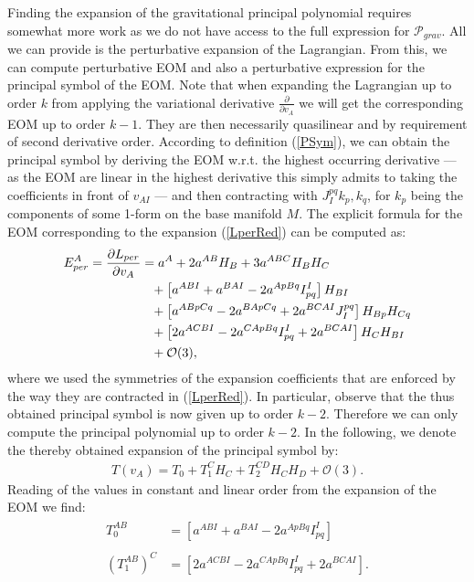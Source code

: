 Finding the expansion of the gravitational principal polynomial requires somewhat more work as we do not have access to the full expression for $\mathcal{P}_{grav}$. All we can provide is the perturbative expansion of the Lagrangian. From this, we can compute perturbative EOM and also a perturbative expression for the principal symbol of the EOM.
Note that when expanding the Lagrangian up to order $k$ from applying the variational derivative $\frac{\partial}{\partial v_A}$ we will get the corresponding EOM up to order $k-1$. They are then necessarily quasilinear and by requirement of second derivative order. According to definition (\ref{PSym}), we can obtain the principal symbol by deriving the EOM w.r.t. the highest occurring derivative  --- as the EOM are linear in the highest derivative this simply admits to taking the coefficients in front of $v_{AI}$ --- and then contracting with $J_I^{pq} k_p, k_q$, for $k_p$ being the components of some 1-form on the base manifold $M$. 
The explicit formula for the EOM corresponding to the expansion (\ref{LperRed}) can be computed as:
\begin{align}\label{EOMPert}
    \begin{aligned}
    E_{per}^A = \frac{\partial L_{per}}{\partial v_A} &= a^A + 2 a^{AB}H_B + 3a^{ABC}H_B H_C \\
    &\hphantom{=}+ \left [a^{ABI} + a^{BAI} - 2 a^{ApBq}I_{pq}^I  \right ] H_{BI} \\
    &\hphantom{=}+ \left[a^{ABpCq} -2a^{BApCq} +2a^{BCAI} J_I^{pq} \right]H_{Bp}H_{Cq} \\
    &\hphantom{=}+ \left [2a^{ACBI} -2a^{CApBq}I_{pq}^I + 2a^{BCAI} \right ]H_C H_{BI} \\
    &\hphantom{=}+ \mathcal{O}(3),
    \end{aligned}
\end{align}
where we used the symmetries of the expansion coefficients that are enforced by the way they are contracted in (\ref{LperRed}).
In particular, observe that the thus obtained principal symbol is now given up to order $k-2$. Therefore we can only compute the principal polynomial up to order $k-2$. In the following, we denote the thereby obtained expansion of the principal symbol by: 
\begin{align}
    T(v_A) = T_0 + T_1^CH_C + T_2^{CD}H_CH_D + \mathcal{O}(3).
\end{align}
Reading of the values in constant and linear order from the expansion of the EOM we find:
\begin{align}
    \begin{aligned}
    T_0^{AB} &= \left [a^{ABI} + a^{BAI} - 2 a^{ApBq}I_{pq}^I  \right ]\\
    \\
    (T_1^{AB})^C &= \left [2a^{ACBI} -2a^{CApBq}I_{pq}^I + 2a^{BCAI} \right ]. 
    \end{aligned}
\end{align}
